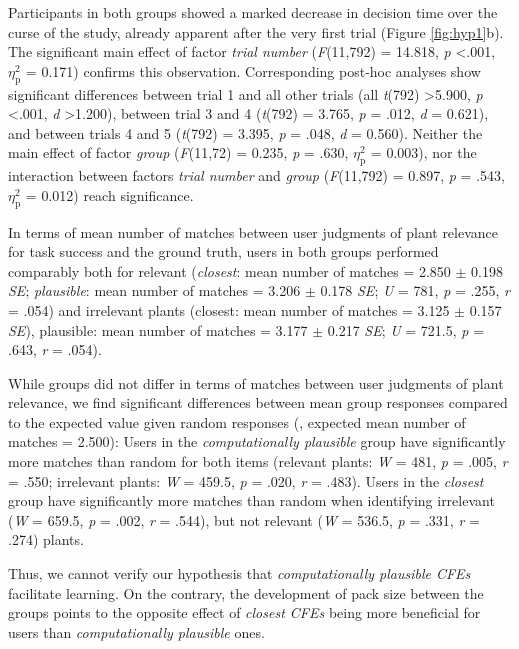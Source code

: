 Participants in both groups showed a marked decrease in decision time over the curse of the study, already apparent after the very first trial (Figure \ref{fig:hyp1}b).
The significant main effect of factor \textit{trial number} (\textit{F}(11,792) = 14.818, \textit{p} \textless .001, $\eta_{\text{p}}^{2}$ = 0.171) confirms this observation.
Corresponding post-hoc analyses show significant differences between trial 1 and all other trials (all \textit{t}(792) \textgreater 5.900, \textit{p} \textless .001, \textit{d} \textgreater 1.200), between trial 3 and 4 (\textit{t}(792) = 3.765, \textit{p} = .012, \textit{d} = 0.621), and between trials 4 and 5 (\textit{t}(792) = 3.395, \textit{p} = .048, \textit{d} = 0.560).
Neither the main effect of factor \textit{group} (\textit{F}(11,72) = 0.235, \textit{p} = .630, $\eta_{\text{p}}^{2}$ = 0.003), nor the interaction between factors \textit{trial number} and \textit{group} (\textit{F}(11,792) = 0.897, \textit{p} = .543, $\eta_{\text{p}}^{2}$ = 0.012) reach significance.

In terms of mean number of matches between user judgments of plant relevance for task success and the ground truth, users in both groups performed comparably both for relevant 
(\textit{closest}: mean number of matches = 2.850 $\pm$ 0.198 \textit{SE}; \textit{plausible}: mean number of matches = 3.206 $\pm$ 0.178 \textit{SE}; \textit{U} = 781, \textit{p} = .255, \textit{r} = .054)
and irrelevant plants (closest: mean number of matches = 3.125 $\pm$ 0.157 \textit{SE}), plausible: mean number of matches = 3.177 $\pm$ 0.217 \textit{SE}; \textit{U} = 721.5, \textit{p} = .643, \textit{r} = .054).

While groups did not differ in terms of matches between user judgments of plant relevance, we find significant differences between mean group responses compared to the expected value given random responses (\ie, expected mean number of matches = 2.500): 
Users in the \textit{computationally plausible} group have significantly more matches than random for both items (relevant plants: \textit{W} = 481, \textit{p} = .005, \textit{r} = .550; irrelevant plants: \textit{W} = 459.5, \textit{p} = .020, \textit{r} = .483).
Users in the \textit{closest} group have significantly more matches than random when identifying irrelevant (\textit{W} = 659.5, \textit{p} = .002, \textit{r} = .544), but not relevant (\textit{W} = 536.5, \textit{p} = .331, \textit{r} = .274) plants.

Thus, we cannot verify our hypothesis that \textit{computationally plausible \glspl{CFE}} facilitate learning. On the contrary, the development of pack size between the groups points to the opposite effect of \textit{closest \glspl{CFE}} being more beneficial for users than \textit{computationally plausible} ones.

